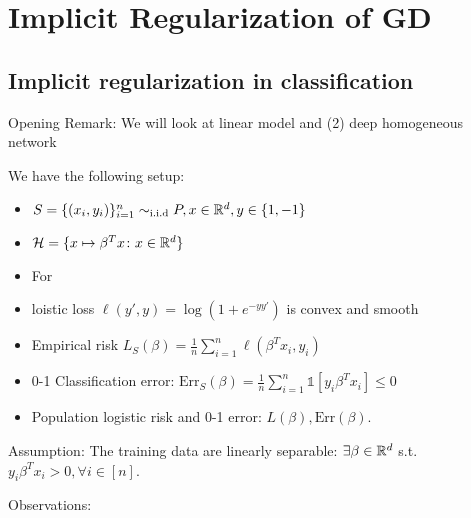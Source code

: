 

\chapter{Implicit Regularization of GD}



\section{Implicit regularization in classification}

Opening Remark: We will look at linear model and (2) deep homogeneous network 

\begin{eg}

    We have the following setup: 

    \begin{itemize}
        \item \(S = \{ (x_i, y_i)\}_{i=1}^n \sim_{\text{i.i.d}} P, x \in \mathbb{R}^d, y \in \{1, -1\}\)
        \item   \( \mathcal{H} = \{ x \mapsto \beta^T x \colon x \in \mathbb{R}^d\}\)
        \item For  
        \item loistic loss \(\ell (y', y) = \log \left( 1 + e^{-y y'}\right)\) is convex and smooth 
        \item Empirical risk \(L_S (\beta) = \frac{1}{n}\sum_{i=1}^n \ell\left(\beta^T x_i, y_i\right)\)
        \item 0-1 Classification error: \(\text{Err}_S (\beta) = \frac{1}{n} \sum_{i=1}^n \mathbb{1} [y_i 
        \beta^T x_i] \leq 0 \)
        \item Population logistic risk and 0-1 error: \(L(\beta), \text{Err}(\beta)\).  
    \end{itemize}

    Assumption: The training data are linearly separable: \(\exists \beta \in \mathbb{R}^d\) s.t. 
    \(y_i\beta^T x_i > 0, \forall i \in [n]\). 

\end{eg}

Observations: 

